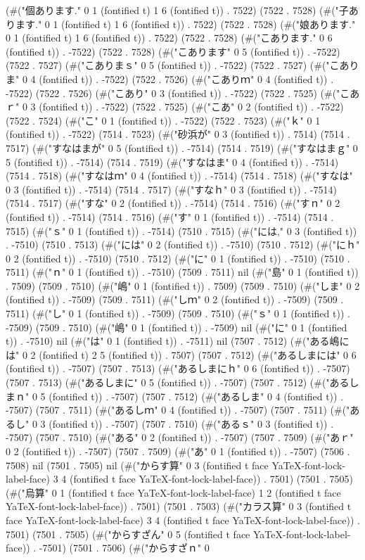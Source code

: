 (#("個あります." 0 1 (fontified t) 1 6 (fontified t)) . 7522) (7522 . 7528) (#("子あります." 0 1 (fontified t) 1 6 (fontified t)) . 7522) (7522 . 7528) (#("娘あります." 0 1 (fontified t) 1 6 (fontified t)) . 7522) (7522 . 7528) (#("こあります." 0 6 (fontified t)) . -7522) (7522 . 7528) (#("こあります" 0 5 (fontified t)) . -7522) (7522 . 7527) (#("こありまｓ" 0 5 (fontified t)) . -7522) (7522 . 7527) (#("こありま" 0 4 (fontified t)) . -7522) (7522 . 7526) (#("こありｍ" 0 4 (fontified t)) . -7522) (7522 . 7526) (#("こあり" 0 3 (fontified t)) . -7522) (7522 . 7525) (#("こあｒ" 0 3 (fontified t)) . -7522) (7522 . 7525) (#("こあ" 0 2 (fontified t)) . -7522) (7522 . 7524) (#("こ" 0 1 (fontified t)) . -7522) (7522 . 7523) (#("ｋ" 0 1 (fontified t)) . -7522) (7514 . 7523) (#("砂浜が" 0 3 (fontified t)) . 7514) (7514 . 7517) (#("すなはまが" 0 5 (fontified t)) . -7514) (7514 . 7519) (#("すなはまｇ" 0 5 (fontified t)) . -7514) (7514 . 7519) (#("すなはま" 0 4 (fontified t)) . -7514) (7514 . 7518) (#("すなはｍ" 0 4 (fontified t)) . -7514) (7514 . 7518) (#("すなは" 0 3 (fontified t)) . -7514) (7514 . 7517) (#("すなｈ" 0 3 (fontified t)) . -7514) (7514 . 7517) (#("すな" 0 2 (fontified t)) . -7514) (7514 . 7516) (#("すｎ" 0 2 (fontified t)) . -7514) (7514 . 7516) (#("す" 0 1 (fontified t)) . -7514) (7514 . 7515) (#("ｓ" 0 1 (fontified t)) . -7514) (7510 . 7515) (#("には," 0 3 (fontified t)) . -7510) (7510 . 7513) (#("には" 0 2 (fontified t)) . -7510) (7510 . 7512) (#("にｈ" 0 2 (fontified t)) . -7510) (7510 . 7512) (#("に" 0 1 (fontified t)) . -7510) (7510 . 7511) (#("ｎ" 0 1 (fontified t)) . -7510) (7509 . 7511) nil (#("島" 0 1 (fontified t)) . 7509) (7509 . 7510) (#("嶋" 0 1 (fontified t)) . 7509) (7509 . 7510) (#("しま" 0 2 (fontified t)) . -7509) (7509 . 7511) (#("しｍ" 0 2 (fontified t)) . -7509) (7509 . 7511) (#("し" 0 1 (fontified t)) . -7509) (7509 . 7510) (#("ｓ" 0 1 (fontified t)) . -7509) (7509 . 7510) (#("嶋" 0 1 (fontified t)) . -7509) nil (#("に" 0 1 (fontified t)) . -7510) nil (#("は" 0 1 (fontified t)) . -7511) nil (7507 . 7512) (#("ある嶋には" 0 2 (fontified t) 2 5 (fontified t)) . 7507) (7507 . 7512) (#("あるしまには" 0 6 (fontified t)) . -7507) (7507 . 7513) (#("あるしまにｈ" 0 6 (fontified t)) . -7507) (7507 . 7513) (#("あるしまに" 0 5 (fontified t)) . -7507) (7507 . 7512) (#("あるしまｎ" 0 5 (fontified t)) . -7507) (7507 . 7512) (#("あるしま" 0 4 (fontified t)) . -7507) (7507 . 7511) (#("あるしｍ" 0 4 (fontified t)) . -7507) (7507 . 7511) (#("あるし" 0 3 (fontified t)) . -7507) (7507 . 7510) (#("あるｓ" 0 3 (fontified t)) . -7507) (7507 . 7510) (#("ある" 0 2 (fontified t)) . -7507) (7507 . 7509) (#("あｒ" 0 2 (fontified t)) . -7507) (7507 . 7509) (#("あ" 0 1 (fontified t)) . -7507) (7506 . 7508) nil (7501 . 7505) nil (#("からす算" 0 3 (fontified t face YaTeX-font-lock-label-face) 3 4 (fontified t face YaTeX-font-lock-label-face)) . 7501) (7501 . 7505) (#("烏算" 0 1 (fontified t face YaTeX-font-lock-label-face) 1 2 (fontified t face YaTeX-font-lock-label-face)) . 7501) (7501 . 7503) (#("カラス算" 0 3 (fontified t face YaTeX-font-lock-label-face) 3 4 (fontified t face YaTeX-font-lock-label-face)) . 7501) (7501 . 7505) (#("からすざん" 0 5 (fontified t face YaTeX-font-lock-label-face)) . -7501) (7501 . 7506) (#("からすざｎ" 0 